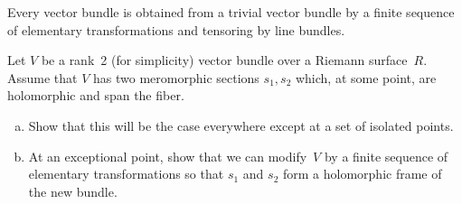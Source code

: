 \documentclass[12pt]{article}
\begin{document}
\begin{proposition}
    Every vector bundle is obtained from a trivial vector bundle by a finite sequence of elementary transformations and tensoring by line bundles.
\end{proposition}

\begin{exercise}
Let $V$ be a rank~2 (for simplicity) vector bundle over a Riemann surface~$R$. 
Assume that $V$ has two meromorphic sections $s_1, s_2$ which, at some point, 
are holomorphic and span the fiber.

\begin{enumerate}[(a)]
    \item Show that this will be the case everywhere except at a set of isolated points.
    \item At an exceptional point, show that we can modify~$V$ by a finite sequence 
    of elementary transformations so that $s_1$ and $s_2$ form a holomorphic frame 
    of the new bundle.
\end{enumerate}
\end{exercise}
\end{document}
